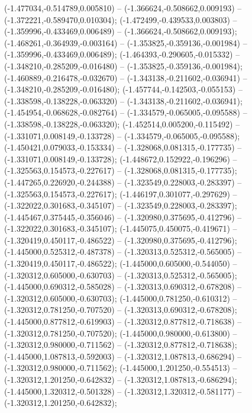  (-1.477034,-0.514789,0.005810) -- (-1.366624,-0.508662,0.009193) -- (-1.372221,-0.589470,0.010304);
 (-1.472499,-0.439533,0.003803) -- (-1.359996,-0.433469,0.006489) -- (-1.366624,-0.508662,0.009193);
 (-1.468261,-0.364939,-0.003164) -- (-1.353825,-0.359136,-0.001984) -- (-1.359996,-0.433469,0.006489);
 (-1.464393,-0.290605,-0.015332) -- (-1.348210,-0.285209,-0.016480) -- (-1.353825,-0.359136,-0.001984);
 (-1.460889,-0.216478,-0.032670) -- (-1.343138,-0.211602,-0.036941) -- (-1.348210,-0.285209,-0.016480);
 (-1.457744,-0.142503,-0.055153) -- (-1.338598,-0.138228,-0.063320) -- (-1.343138,-0.211602,-0.036941);
 (-1.454954,-0.068628,-0.082764) -- (-1.334579,-0.065005,-0.095588) -- (-1.338598,-0.138228,-0.063320);
 (-1.452514,0.005200,-0.115492) -- (-1.331071,0.008149,-0.133728) -- (-1.334579,-0.065005,-0.095588);
 (-1.450421,0.079033,-0.153334) -- (-1.328068,0.081315,-0.177735) -- (-1.331071,0.008149,-0.133728);
 (-1.448672,0.152922,-0.196296) -- (-1.325563,0.154573,-0.227617) -- (-1.328068,0.081315,-0.177735);
 (-1.447265,0.226920,-0.244388) -- (-1.323549,0.228003,-0.283397) -- (-1.325563,0.154573,-0.227617);
 (-1.446197,0.301077,-0.297629) -- (-1.322022,0.301683,-0.345107) -- (-1.323549,0.228003,-0.283397);
 (-1.445467,0.375445,-0.356046) -- (-1.320980,0.375695,-0.412796) -- (-1.322022,0.301683,-0.345107);
 (-1.445075,0.450075,-0.419671) -- (-1.320419,0.450117,-0.486522) -- (-1.320980,0.375695,-0.412796);
 (-1.445000,0.525312,-0.487378) -- (-1.320313,0.525312,-0.565005) -- (-1.320419,0.450117,-0.486522);
 (-1.445000,0.605000,-0.544050) -- (-1.320312,0.605000,-0.630703) -- (-1.320313,0.525312,-0.565005);
 (-1.445000,0.690312,-0.585028) -- (-1.320313,0.690312,-0.678208) -- (-1.320312,0.605000,-0.630703);
 (-1.445000,0.781250,-0.610312) -- (-1.320312,0.781250,-0.707520) -- (-1.320313,0.690312,-0.678208);
 (-1.445000,0.877812,-0.619903) -- (-1.320312,0.877812,-0.718638) -- (-1.320312,0.781250,-0.707520);
 (-1.445000,0.980000,-0.613800) -- (-1.320312,0.980000,-0.711562) -- (-1.320312,0.877812,-0.718638);
 (-1.445000,1.087813,-0.592003) -- (-1.320312,1.087813,-0.686294) -- (-1.320312,0.980000,-0.711562);
 (-1.445000,1.201250,-0.554513) -- (-1.320312,1.201250,-0.642832) -- (-1.320312,1.087813,-0.686294);
 (-1.445000,1.320312,-0.501328) -- (-1.320312,1.320312,-0.581177) -- (-1.320312,1.201250,-0.642832);
